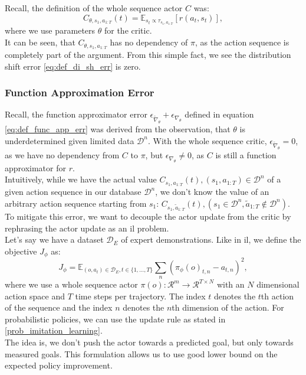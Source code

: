 Recall, the definition of the whole sequence actor $C$ was: 
$$C_{\theta, s_1, a_{1:T}}(t) = \mathbb{E}_{s_t \propto \tau_{s_1, a_{1:T}}}\left[r(a_t, s_t)\right],$$
where we use parameters $\theta$ for the critic.\\
It can be seen, that $C_{\theta, s_1, a_{1:T}}$ has no dependency of $\pi$, as the action sequence is completely part of the argument. From this simple fact, we 
see the distribution shift error \ref{eq:def_di_sh_err} is zero. 

\subsubsection{Function Approximation Error}
\label{func_app_error}
Recall, the function approximator error $\epsilon_{\widetilde{\nabla}_{\theta}} + \epsilon_{\nabla_{\theta}}$ defined in equation \ref{eq:def_func_app_err} was 
derived from the observation, that $\theta$ is underdetermined 
given limited data $\mathcal{D}^n$. With the whole sequence critic, $\epsilon_{\widetilde{\nabla}_{\theta}} = 0$, as we have no dependency from $C$ to $\pi$, 
but $\epsilon_{\nabla_{\theta}} \neq 0$, as $C$ is still a function approximator for $r$.\\

Intuitively, while we have the actual value $C_{s_1, a_{1:T}}(t), (s_1, a_{1:T}) \in \mathcal{D}^n$ of a given action sequence in our database $\mathcal{D}^n$, 
we don't know the value of an arbitrary action sequence starting from $s_1$: $C_{s_1, \tilde{a}_{1:T}}(t), (s_1 \in \mathcal{D}^n, \tilde{a}_{1:T} \notin \mathcal{D}^n)$. \\
To mitigate this error, we want to decouple the actor update from the critic by rephrasing the actor update as an \ac{il} problem. \\
Let's say we have a dataset $\mathcal{D}_E$ of expert demonstrations. Like in \ac{il}, we define the objective $J_{\phi}$ as:
\begin{equation}
    \label{eq:ac_obj_1}
    J_{\phi} = \mathbb{E}_{(o, a_{t}) \in \mathcal{D}_E, t \in \{1, ..., T\}}\sum_n \left(\pi_{\phi}(o)_{t, n} - a_{t, n}\right)^2,
\end{equation}
where we use a whole sequence actor 
$\pi(o):\mathcal{R}^m \rightarrow \mathcal{R}^{T \times N}$ with an $N$ dimensional action space and $T$ time steps per trajectory. The index $t$ denotes the $t$th action of the sequence and the index $n$ denotes the $n$th dimension of 
the action. For probabilistic policies, we can use the update rule as stated in \ref{prob_imitation_learning}.\\ 
The idea is, we don't push the actor towards a predicted goal, 
but only towards measured goals. This formulation allows us to use good lower bound on the expected policy improvement.\\


